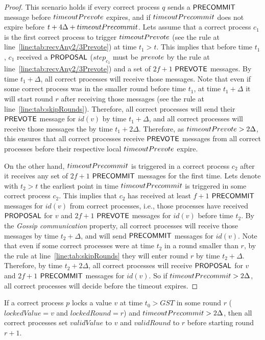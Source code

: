 \begin{proof}
This scenario holds if every correct process $q$ sends a $\mathsf{PRECOMMIT}$ message
before $timeoutPrevote$ expires, and if $timeoutPrecommit$ does not expire
before $t + 4\Delta + timeoutPrecommit$.  Lets assume that a correct process
$c_1$ is the first correct process to trigger $timeoutPrevote$ (see the rule
at line~\ref{line:tab:recvAny2/3Prevote}) at time $t_1 > t$. This implies that
before time $t_1$, $c_1$ received a $\mathsf{PROPOSAL}$ ($step_{c_1}$ must be
$prevote$ by the rule at line~\ref{line:tab:recvAny2/3Prevote}) and a set of
$2f+1$ $\mathsf{PREVOTE}$ messages.  By time $t_1 + \Delta$, all correct processes will
receive those messages. Note that even if some correct process was in the
smaller round before time $t_1$, at time $t_1 + \Delta$ it will start round $r$
after receiving those messages (see the rule at
line~\ref{line:tab:skipRounds}).  Therefore, all correct processes will send
their $\mathsf{PREVOTE}$ message for $id(v)$ by time $t_1 + \Delta$, and all correct
processes will receive those messages the by time $t_1 + 2\Delta$.  Therefore,
as $timeoutPrevote > 2\Delta$, this ensures that all correct processes receive
$\mathsf{PREVOTE}$ messages from all correct processes before their respective local
$timeoutPrevote$ expire.   

On the other hand, $timeoutPrecommit$ is triggered in a correct process $c_2$
after it receives any set of $2f+1$ $\mathsf{PRECOMMIT}$ messages for the first time.
Lets denote with $t_2 > t$ the earliest point in time $timeoutPrecommit$ is
triggered in some correct process $c_2$. This implies that $c_2$ has received
at least $f+1$ $\mathsf{PRECOMMIT}$ messages for $id(v)$ from correct processes, i.e.,
those processes have received $\mathsf{PROPOSAL}$ for $v$ and $2f+1$ $\mathsf{PREVOTE}$
messages for $id(v)$ before time $t_2$. By the \emph{Gossip communication}
property, all correct processes will receive those messages by time $t_2 +
\Delta$, and will send $\mathsf{PRECOMMIT}$ messages for $id(v)$. Note that even if
some correct processes were at time $t_2$ in a round smaller than $r$, by the
rule at line~\ref{line:tab:skipRounds} they will enter round $r$ by time $t_2 +
\Delta$.  Therefore, by time $t_2 + 2\Delta$, all correct processes will
receive $\mathsf{PROPOSAL}$ for $v$ and $2f+1$ $\mathsf{PRECOMMIT}$ messages for $id(v)$. So if
$timeoutPrecommit > 2\Delta$, all correct processes will decide before the
timeout expires.         \end{proof}	


\begin{lemma} \label{lemma:validValue} If a correct process $p$ locks a value
    $v$ at time $t_0 > GST$ in some round $r$ ($lockedValue = v$ and
    $lockedRound = r$) and $timeoutPrecommit> 2\Delta$, then all correct
    processes set $validValue$ to $v$ and $validRound$ to $r$ before starting
    round $r+1$.  \end{lemma}
 
